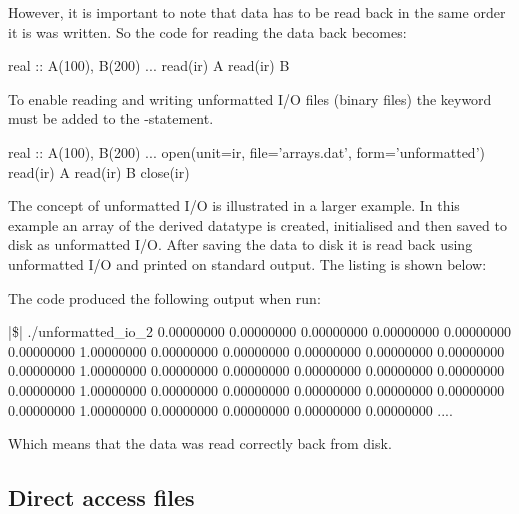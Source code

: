 However, it is important to note that data has to be read back in the same order it is was written. So the code for reading the data back becomes:

\begin{fortrancodeenv}
real :: A(100), B(200)
...
read(ir) A
read(ir) B
\end{fortrancodeenv}

To enable reading and writing unformatted I/O files (binary files) the keyword  must be added to the -statement.

\begin{fortrancodeenv}
real :: A(100), B(200)
...
open(unit=ir, file='arrays.dat', form='unformatted')
read(ir) A
read(ir) B
close(ir)
\end{fortrancodeenv}

The concept of unformatted I/O is illustrated in a larger example. In this example an array of the derived datatype  is created, initialised and then saved to disk as unformatted I/O. After saving the data to disk it is read back using unformatted I/O and printed on standard output. The listing is shown below:


The code produced the following output when run:

\cmdmode

\begin{fortrancodeenv}
|\$| ./unformatted_io_2
   0.00000000       0.00000000       0.00000000       0.00000000       0.00000000       0.00000000       1.00000000       0.00000000       0.00000000       0.00000000       0.00000000       0.00000000       0.00000000       1.00000000       0.00000000       0.00000000       0.00000000       0.00000000       0.00000000       0.00000000       1.00000000       0.00000000       0.00000000       0.00000000       0.00000000       0.00000000       0.00000000       1.00000000       0.00000000       0.00000000       0.00000000       0.00000000 ....
\end{fortrancodeenv}

Which means that the data was read correctly back from disk.

\subsection{Direct access files}

